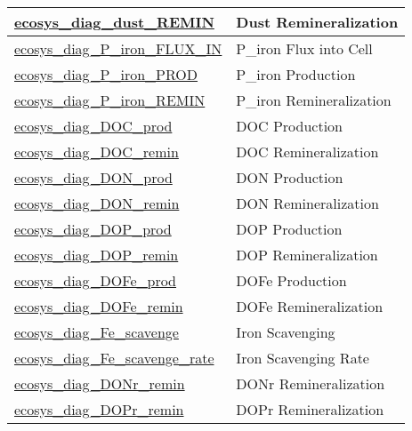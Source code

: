 {\begin{center}
\begin{longtable}{| p{2.0in} | p{4.0in} |}
    \hline
    \hyperref[subsec:var_sec_forcing_ecosys_diag_dust_REMIN]{ecosys\_diag\_dust\_REMIN} & Dust Remineralization \\
    \hline
    \hyperref[subsec:var_sec_forcing_ecosys_diag_P_iron_FLUX_IN]{ecosys\_diag\_P\_iron\_FLUX\_\-IN} & P\_iron Flux into Cell \\
    \hline
    \hyperref[subsec:var_sec_forcing_ecosys_diag_P_iron_PROD]{ecosys\_diag\_P\_iron\_PROD} & P\_iron Production \\
    \hline
    \hyperref[subsec:var_sec_forcing_ecosys_diag_P_iron_REMIN]{ecosys\_diag\_P\_iron\_REMIN} & P\_iron Remineralization \\
    \hline
    \hyperref[subsec:var_sec_forcing_ecosys_diag_DOC_prod]{ecosys\_diag\_DOC\_prod} & DOC Production \\
    \hline
    \hyperref[subsec:var_sec_forcing_ecosys_diag_DOC_remin]{ecosys\_diag\_DOC\_remin} & DOC Remineralization \\
    \hline
    \hyperref[subsec:var_sec_forcing_ecosys_diag_DON_prod]{ecosys\_diag\_DON\_prod} & DON Production \\
    \hline
    \hyperref[subsec:var_sec_forcing_ecosys_diag_DON_remin]{ecosys\_diag\_DON\_remin} & DON Remineralization \\
    \hline
    \hyperref[subsec:var_sec_forcing_ecosys_diag_DOP_prod]{ecosys\_diag\_DOP\_prod} & DOP Production \\
    \hline
    \hyperref[subsec:var_sec_forcing_ecosys_diag_DOP_remin]{ecosys\_diag\_DOP\_remin} & DOP Remineralization \\
    \hline
    \hyperref[subsec:var_sec_forcing_ecosys_diag_DOFe_prod]{ecosys\_diag\_DOFe\_prod} & DOFe Production \\
    \hline
    \hyperref[subsec:var_sec_forcing_ecosys_diag_DOFe_remin]{ecosys\_diag\_DOFe\_remin} & DOFe Remineralization \\
    \hline
    \hyperref[subsec:var_sec_forcing_ecosys_diag_Fe_scavenge]{ecosys\_diag\_Fe\_scavenge} & Iron Scavenging \\
    \hline
    \hyperref[subsec:var_sec_forcing_ecosys_diag_Fe_scavenge_rate]{ecosys\_diag\_Fe\_scavenge\_rate} & Iron Scavenging Rate \\
    \hline
    \hyperref[subsec:var_sec_forcing_ecosys_diag_DONr_remin]{ecosys\_diag\_DONr\_remin} & DONr Remineralization \\
    \hline
    \hyperref[subsec:var_sec_forcing_ecosys_diag_DOPr_remin]{ecosys\_diag\_DOPr\_remin} & DOPr Remineralization \\

\end{longtable}
\end{center}}
